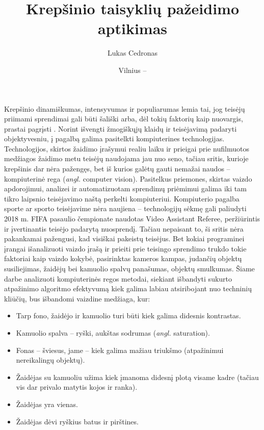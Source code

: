 \documentclass{VUMIFPSkursinis}
\title{Krepšinio taisyklių pažeidimo aptikimas}
\author{Lukas Cedronas}
\date{Vilnius – \the\year}
\begin{document}
\maketitle

\tableofcontents

Krepšinio dinamiškumas, intensyvumas ir populiarumas lemia tai, jog teisėjų priimami sprendimai gali būti šališki \cite{ProfitableBias} arba, dėl tokių faktorių kaip nuovargis, prastai pagrįsti \cite{MissedCalls}. Norint išvengti žmogiškųjų klaidų ir teisėjavimą padaryti objektyvesniu, į pagalbą galima pasitelkti kompiuterines technologijas. Technologijos, skirtos žaidimo įrašymui realiu laiku ir prieigai prie nufilmuotos medžiagos žaidimo metu teisėjų naudojama jau nuo seno, tačiau sritis, kurioje krepšinis dar nėra pažengęs, bet iš kurios galėtų gauti nemažai naudos – kompiuterinė rega (\textit{angl.} computer vision). Pasitelkus priemones, skirtas vaizdo apdorojimui, analizei ir automatizuotam sprendimų priėmimui galima iki tam tikro laipsnio teisėjavimo naštą perkelti kompiuteriui. Kompiuterio pagalba sporte ar sporto teisėjavime nėra naujiena – technologijų sėkmę gali paliudyti  2018 m. FIFA pasaulio čempionate naudotas Video Assistant Referee, peržiūrintis ir įvertinantis teisėjo padarytą nuosprendį. Tačiau nepaisant to, ši sritis nėra pakankamai pažengusi, kad visiškai pakeistų teisėjus. Bet kokiai programinei įrangai išanalizuoti vaizdo įrašą ir prieiti prie teisingo sprendimo trukdo tokie faktoriai kaip vaizdo kokybė, pasirinktas kameros kampas, judančių objektų susiliejimas, žaidėjų bei kamuolio spalvų panašumas, objektų smulkumas. Šiame darbe analizuoti kompiuterinės regos metodai, siekiant išbandyti sukurto atpažinimo algoritmo efektyvumą kiek galima labiau atsiribojant nuo techninių kliūčių, bus išbandomi vaizdine medžiaga, kur:
\begin{itemize}
 \item Tarp fono, žaidėjo ir kamuolio turi būti kiek galima didesnis kontrastas.
 \item Kamuolio spalva – ryški, aukštas sodrumas (\textit{angl.} saturation).
 \item Fonas – šviesus, jame – kiek galima mažiau triukšmo (atpažinimui nereikalingų objektų).
 \item Žaidėjas su kamuoliu užima kiek įmanoma didesnį plotą visame kadre (tačiau vis dar privalo matytis kojos ir ranka).
 \item Žaidėjas yra vienas.
 \item Žaidėjas dėvi ryškius batus ir pirštines.
\end{itemize}
\end{document}
